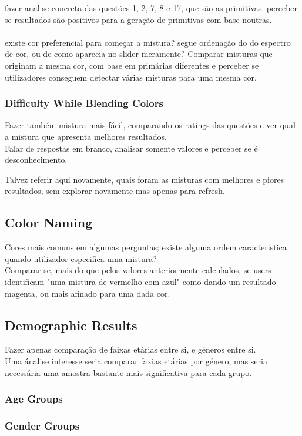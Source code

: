 fazer analise concreta das questões 1, 2, 7, 8 e 17, que são as primitivas. perceber se resultados são positivos para a geração de primitivas com base noutras. \\\\
%
existe cor preferencial para começar a mistura? segue ordenação do do espectro de cor, ou de como aparecia no slider meramente?
%
Comparar misturas que originam a mesma cor, com base em primárias diferentes e perceber se utilizadores conseguem detectar várias
misturas para uma mesma cor. \par
%
\subsubsection{Difficulty While Blending Colors}
\label{subsubsec:difficulty_rating}
%
Fazer também mistura mais fácil, comparando os ratings das questões e ver qual a mistura que apresenta melhores resultados. \\
Falar de respostas em branco, analisar somente valores e perceber se é desconhecimento. \par
%
Talvez referir aqui novamente, quais foram as misturas com melhores e piores resultados, sem explorar novamente mas apenas para refresh.
%
\subsection{Color Naming}
\label{subsec:results_namingcolors}
%
Cores mais comuns em algumas perguntas; existe alguma ordem caracteristica quando utilizador especifica uma mistura? \\
Comparar se, mais do que pelos valores anteriormente calculados, se users identificam "uma mistura de vermelho com azul" como dando um resultado
magenta, ou mais afinado para uma dada cor.
%
\subsection{Demographic Results}
\label{subsec:results_demographic}
%
Fazer apenas comparação de faixas etárias entre si, e géneros entre si. \\
Uma ánalise interesse seria comparar faxias etárias por género, mas seria necessária uma amostra bastante mais significativa para cada grupo.
%
\subsubsection{Age Groups}
\label{subsubsec:demo_age}
%
\subsubsection{Gender Groups}
\label{subsubsec:demo_age}
%
